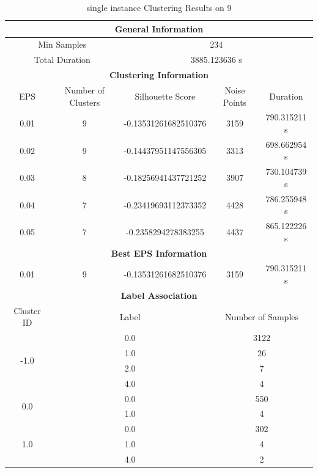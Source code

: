 \begin{longtable}{|c|c|c|c|c|}
\caption{single instance Clustering Results on 9} \label{tab:9_single_instance_clustering_results}\\
\hline
\multicolumn{5}{|c|}{\textbf{General Information}} \\
\hline
\multicolumn{2}{|c|}{Min Samples} & \multicolumn{3}{c|}{234} \\
\multicolumn{2}{|c|}{Total Duration} & \multicolumn{3}{c|}{3885.123636 s} \\
\hline
\multicolumn{5}{|c|}{\textbf{Clustering Information}} \\
\hline
EPS & Number of Clusters & Silhouette Score & Noise Points & Duration \\
0.01 & 9 & -0.13531261682510376 & 3159 & 790.315211 s\\
0.02 & 9 & -0.14437951147556305 & 3313 & 698.662954 s\\
0.03 & 8 & -0.18256941437721252 & 3907 & 730.104739 s\\
0.04 & 7 & -0.23419693112373352 & 4428 & 786.255948 s\\
0.05 & 7 & -0.2358294278383255 & 4437 & 865.122226 s\\
\hline
\multicolumn{5}{|c|}{\textbf{Best EPS Information}} \\
\hline
0.01 & 9 & -0.13531261682510376 & 3159 & 790.315211 s\\
\hline
\multicolumn{5}{|c|}{\textbf{Label Association}} \\
\hline
Cluster ID & \multicolumn{2}{c|}{Label} & \multicolumn{2}{c|}{Number of Samples} \\
\hline
\multirow{4}{*}{-1.0} & \multicolumn{2}{c|}{0.0} & \multicolumn{2}{c|}{3122} \\
& \multicolumn{2}{c|}{1.0} & \multicolumn{2}{c|}{26} \\
& \multicolumn{2}{c|}{2.0} & \multicolumn{2}{c|}{7} \\
& \multicolumn{2}{c|}{4.0} & \multicolumn{2}{c|}{4} \\
\hline
\multirow{2}{*}{0.0} & \multicolumn{2}{c|}{0.0} & \multicolumn{2}{c|}{550} \\
& \multicolumn{2}{c|}{1.0} & \multicolumn{2}{c|}{4} \\
\hline
\multirow{3}{*}{1.0} & \multicolumn{2}{c|}{0.0} & \multicolumn{2}{c|}{302} \\
& \multicolumn{2}{c|}{1.0} & \multicolumn{2}{c|}{4} \\
& \multicolumn{2}{c|}{4.0} & \multicolumn{2}{c|}{2} \\

\end{longtable}
